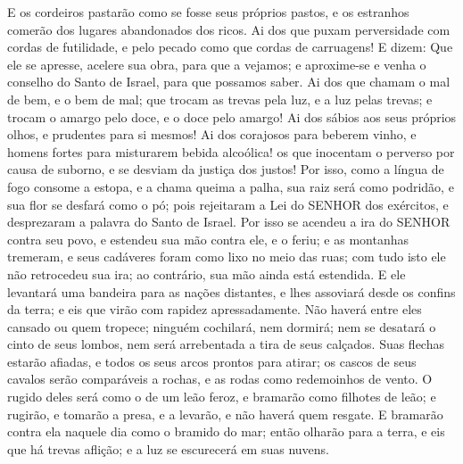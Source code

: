 {E os cordeiros pastarão como se fosse seus próprios pastos, e os estranhos comerão
{} dos lugares abandonados dos ricos.
Ai dos que puxam perversidade com cordas de futilidade,
 e pelo pecado como que
{} cordas de carruagens!
E dizem: Que ele se apresse, acelere sua obra, para que a vejamos; e aproxime-se e venha o conselho do Santo de Israel, para que possamos saber.
Ai dos que chamam o mal de bem, e o bem de mal; que trocam as trevas pela luz, e a luz pelas trevas; e trocam o amargo pelo doce, e o doce pelo amargo!
Ai dos
{} sábios aos seus próprios olhos, e prudentes para si mesmos!
Ai dos
{} corajosos para beberem vinho, e homens fortes para misturarem bebida alcoólica!
 os que inocentam o perverso por causa de suborno, e se desviam da justiça dos justos!
Por isso, como a língua de fogo consome a estopa, e a chama queima a palha,
{} sua raiz será como podridão, e sua flor se desfará como o pó; pois rejeitaram a Lei do SENHOR dos exércitos, e desprezaram a palavra do Santo de Israel.
Por isso se acendeu a ira do SENHOR contra seu povo, e estendeu sua mão contra ele, e o feriu; e as montanhas tremeram, e seus cadáveres foram como lixo no meio das ruas; com tudo isto ele não retrocedeu sua ira; ao contrário, sua mão ainda está estendida.
E ele levantará uma bandeira para as nações distantes, e lhes assoviará desde os confins da terra; e eis que virão com rapidez apressadamente.
Não haverá entre eles cansado ou quem tropece; ninguém cochilará, nem dormirá; nem se desatará o cinto de seus lombos, nem será arrebentada a tira de seus calçados.
Suas flechas estarão afiadas, e todos os seus arcos prontos para atirar; os cascos de seus cavalos serão comparáveis a rochas, e as rodas
{} como redemoinhos de vento.
O rugido deles será como o de um leão feroz, e bramarão como filhotes de leão; e rugirão, e tomarão a presa, e a levarão, e não haverá quem
{} resgate.
E bramarão contra ela naquele dia como o bramido do mar; então olharão para a terra, e eis que há trevas
{} aflição; e a luz se escurecerá em suas nuvens.

}
